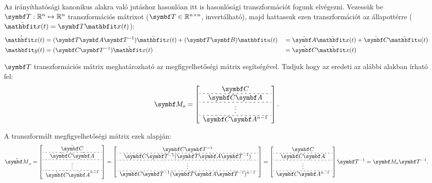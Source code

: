 Az irányíthatósági kanonikus alakra való jutáshoz hasonlóan itt is hasonlósági
transzformációt fogunk elvégezni. Vezessük be $\rmat T: \mathbb R^n \mapsto
  \mathbb R^n$ transzformációs mátrixot ($\rmat T \in \mathbb R^{n \times n}$,
invertálható), majd hattassuk ezen transzformációt az állapottérre
($\tvec x(t) = \rmat T \rvec x(t)$):
\begin{alignat}{9}
  \dot{\tvec x}(t) & = (\rmat T \rmat A \rmat T^{-1}) \tvec x(t) + (\rmat T \rmat B) \rvec u(t)
                   &
                   & = \tmat A \tvec x(t) + \tmat C \tvec u(t)
  \\
  \rvec y(t)       & = (\rmat C \rmat T^{-1}) \tvec x(t)
                   &
                   & = \tmat C \tvec x(t)
\end{alignat}

$\rmat T$ transzformációs mátrix meghatározható az megfigyelhetőségi mátrix
segítségével. Tudjuk hogy az eredeti az alábbi alakban írható fel:
\bgroup
\def\arraystretch{1.2}
\begin{equation}
  \rmat M_o = \left[\begin{array}{ c }
      \rmat C         \\ \hdashline[3pt/3pt]
      \rmat C \rmat A \\ \hdashline[3pt/3pt]
      \vdots          \\ \hdashline[3pt/3pt]
      \rmat C \rmat A^{n-1}
    \end{array}\right]
  .
\end{equation}
\egroup

A transzformált megfigyelhetőségi mátrix ezek alapján:
\bgroup
\def\arraystretch{1.2}
\begin{equation}
  \tmat M_o
  =
  \left[\begin{array}{ c }
      \tmat C         \\ \hdashline[3pt/3pt]
      \tmat C \tmat A \\ \hdashline[3pt/3pt]
      \vdots          \\ \hdashline[3pt/3pt]
      \tmat C \tmat A^{n-1}
    \end{array}\right]
  =
  \left[\begin{array}{ c }
      \rmat C \rmat T^{-1}                                \\ \hdashline[3pt/3pt]
      \rmat C \rmat T^{-1} (\rmat T \rmat A \rmat T^{-1}) \\ \hdashline[3pt/3pt]
      \vdots                                              \\ \hdashline[3pt/3pt]
      \rmat C \rmat T^{-1} (\rmat T \rmat A \rmat T^{-1})^{n-1}
    \end{array}\right]
  =
  \left[\begin{array}{ c }
      \rmat C         \\ \hdashline[3pt/3pt]
      \rmat C \rmat A \\ \hdashline[3pt/3pt]
      \vdots          \\ \hdashline[3pt/3pt]
      \rmat C \rmat A^{n-1}
    \end{array}\right] \rmat T^{-1}
  =
  \rmat M_o \rmat T^{-1}.
\end{equation}
\egroup

